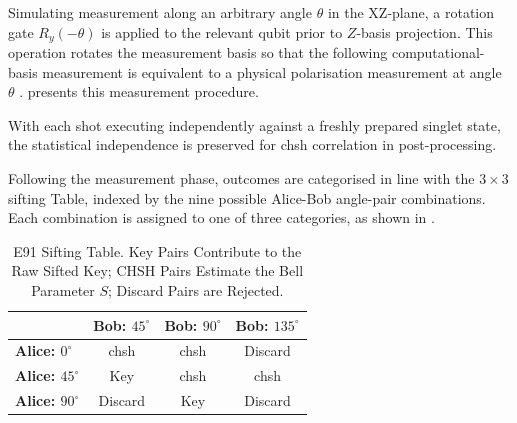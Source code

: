 Simulating measurement along an arbitrary angle $\theta$ in the XZ-plane, a rotation gate $R_y(-\theta)$ is applied to the relevant \gls{qubit} prior to $Z$-basis projection. This operation rotates the measurement basis so that the following computational-basis measurement is equivalent to a physical polarisation measurement at angle $\theta$ \cite{e91Qiskit}.  presents this measurement procedure.

\begin{algorithm}[htbp]
    \caption{E91 Angular Measurement.}\label{alg:e91_meas}
\end{algorithm}

With each shot executing independently against a freshly prepared singlet state, the statistical independence is preserved for \gls{chsh} correlation in post-processing.

Following the measurement phase, outcomes are categorised in line with the $3 \times 3$ \gls{sifting} Table, indexed by the nine possible Alice-Bob angle-pair combinations. Each combination is assigned to one of three categories, as shown in .

\begin{table}[htbp]
\centering
\caption{E91 Sifting Table. Key Pairs Contribute to the Raw Sifted Key; CHSH Pairs Estimate the Bell Parameter $S$; Discard Pairs are Rejected.}
\begin{tabular}{lccc}
\toprule
 & \textbf{Bob: $45^\circ$} & \textbf{Bob: $90^\circ$} & \textbf{Bob: $135^\circ$} \\
\midrule
\textbf{Alice: $0^\circ$} & \gls{chsh} & \gls{chsh} & Discard \\
\textbf{Alice: $45^\circ$} & Key & \gls{chsh} & \gls{chsh} \\
\textbf{Alice: $90^\circ$} & Discard & Key & Discard \\
\bottomrule
\end{tabular}
\label{tab:e91_sift}
\end{table}

